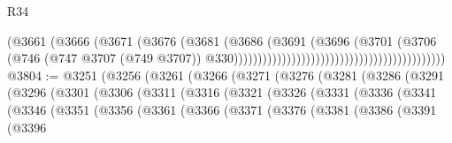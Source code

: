 \begin{lexlean}{R34}
\begin{coremodule}
                                                                      (@3661
                                                                        (@3666
                                                                          (@3671
                                                                            (@3676
                                                                              (@3681
                                                                                (@3686
                                                                                  (@3691
                                                                                    (@3696
                                                                                      (@3701
                                                                                        (@3706
                                                                                          (@746
                                                                                            (@747
                                                                                              @3707
                                                                                              (@749
                                                                                                @3707))
                                                                                            @330))))))))))))))))))))))))))))))))))))))))))))
@3804 := @3251
    (@3256
      (@3261
        (@3266
          (@3271
            (@3276
              (@3281
                (@3286
                  (@3291
                    (@3296
                      (@3301
                        (@3306
                          (@3311
                            (@3316
                              (@3321
                                (@3326
                                  (@3331
                                    (@3336
                                      (@3341
                                        (@3346
                                          (@3351
                                            (@3356
                                              (@3361
                                                (@3366
                                                  (@3371
                                                    (@3376
                                                      (@3381
                                                        (@3386
                                                          (@3391
                                                            (@3396

\end{coremodule}
\end{lexlean}
